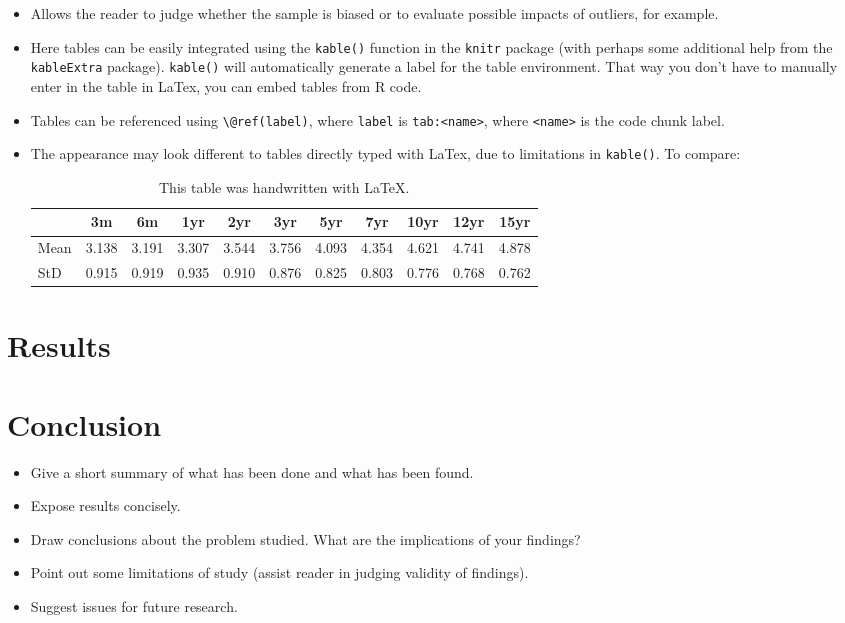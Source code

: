 \documentclass[a4paper,11pt]{article}
\begin{document}
\begin{itemize}
\item
  Allows the reader to judge whether the sample is biased or to evaluate
  possible impacts of outliers, for example.
\item
  Here tables can be easily integrated using the \texttt{kable()} function in the
  \texttt{knitr} package (with perhaps some additional help from the \texttt{kableExtra}
  package). \texttt{kable()} will automatically generate a label for the table
  environment. That way you don't have to manually enter in the table in LaTex,
  you can embed tables from R code.
\item
  Tables can be referenced using \texttt{\textbackslash{}@ref(label)}, where \texttt{label} is \texttt{tab:\textless{}name\textgreater{}},
  where \texttt{\textless{}name\textgreater{}} is the code chunk label.
\item
  The appearance may look different to tables directly typed with LaTex, due to
  limitations in \texttt{kable()}. To compare:
  \begin{table}[ht]
    \begin{center}
        {\footnotesize
        \begin{tabular}{l|cccccccccc}
            \hline \hline
                      & 3m    & 6m    & 1yr   & 2yr   & 3yr   & 5yr   & 7yr   & 10yr  & 12yr  & 15yr   \\
            \hline
                Mean   & 3.138 & 3.191 & 3.307 & 3.544 & 3.756 & 4.093 & 4.354 & 4.621 & 4.741 & 4.878  \\
                StD    & 0.915 & 0.919 & 0.935 & 0.910 & 0.876 & 0.825 & 0.803 & 0.776 & 0.768 & 0.762  \\
            \hline \hline
        \end{tabular}}
    \end{center}
    \caption{This table was handwritten with LaTeX.}
    \label{tab:table2}
    \end{table}
\end{itemize}
\hypertarget{results}{%
\section{Results}\label{results}}

\hypertarget{conclusion}{%
\section{Conclusion}\label{conclusion}}
\begin{itemize}
\item
  Give a short summary of what has been done and what has been found.
\item
  Expose results concisely.
\item
  Draw conclusions about the problem studied. What are the implications of your
  findings?
\item
  Point out some limitations of study (assist reader in judging validity of
  findings).
\item
  Suggest issues for future research.
\end{itemize}
\newpage
\end{document}
